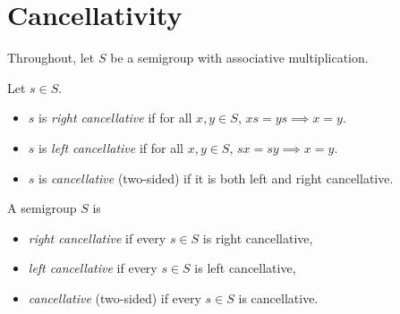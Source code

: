 
\section{Cancellativity}

Throughout, let \(S\) be a semigroup with associative multiplication.

\begin{definition}
\label{def:cancellative-element}
Let \(s\in S\).
\begin{itemize}
  \item \(s\) is \emph{right cancellative} if for all \(x,y\in S\), \(x s = y s \implies x = y\).
  \item \(s\) is \emph{left cancellative} if for all \(x,y\in S\), \(s x = s y \implies x = y\).
  \item \(s\) is \emph{cancellative} (two-sided) if it is both left and right cancellative.
\end{itemize}
\end{definition}

\begin{definition}
\label{def:cancellative-semigroup}
A semigroup \(S\) is
\begin{itemize}
  \item \emph{right cancellative} if every \(s\in S\) is right cancellative,
  \item \emph{left cancellative} if every \(s\in S\) is left cancellative,
  \item \emph{cancellative} (two-sided) if every \(s\in S\) is cancellative.
\end{itemize}
\end{definition}

